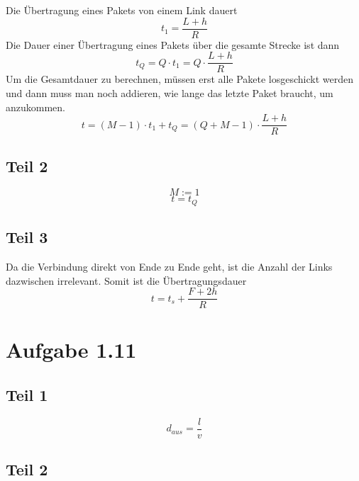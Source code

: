 \documentclass[10pt,a4paper]{article}
\begin{document}
Die Übertragung eines Pakets von einem Link dauert
\begin{equation}
  t_{1} = \frac{L + h}{R}
\end{equation}
Die Dauer einer Übertragung eines Pakets über die gesamte Strecke ist dann
\begin{equation}
  t_{Q} = Q \cdot t_{1} = Q \cdot \frac{L + h}{R}
\end{equation}
Um die Gesamtdauer zu berechnen, müssen erst alle Pakete losgeschickt werden und
dann muss man noch addieren, wie lange das letzte Paket braucht, um anzukommen.
\begin{equation}
  t = (M - 1) \cdot t_{1} + t_{Q} = (Q + M - 1) \cdot \frac{L + h}{R}
\end{equation}

\subsection{Teil 2}

\begin{equation}
  M := 1
\end{equation}
\begin{equation}
  t = t_{Q}
\end{equation}

\subsection{Teil 3}

Da die Verbindung direkt von Ende zu Ende geht, ist die Anzahl der Links
dazwischen irrelevant. Somit ist die Übertragungsdauer
\begin{equation}
  t = t_{s} + \frac{F + 2h}{R}
\end{equation}

\section{Aufgabe 1.11}

\subsection{Teil 1}

\begin{equation}
  d_{aus} = \frac{l}{v}
\end{equation}

\subsection{Teil 2}
\end{document}
